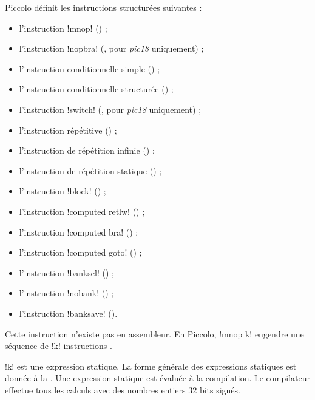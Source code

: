 Piccolo définit les instructions structurées suivantes :
\begin{itemize}
  \item l'instruction \pic!mnop! () ;
  \item l'instruction \pic!nopbra! (, pour \emph{pic18} uniquement) ;
  \item l'instruction conditionnelle simple () ;
  \item l'instruction conditionnelle structurée () ;
  \item l'instruction \pic!switch! (, pour \emph{pic18} uniquement) ;
  \item l'instruction répétitive () ;
  \item l'instruction de répétition infinie () ;
  \item l'instruction de répétition statique () ;
  \item l'instruction \pic!block! () ;
  \item l'instruction \pic!computed retlw! () ;
  \item l'instruction \pic!computed bra! () ;
  \item l'instruction \pic!computed goto! () ;
  \item l'instruction \pic!banksel! () ;
  \item l'instruction \pic!nobank! () ;
  \item l'instruction \pic!banksave! ().
\end{itemize}





Cette instruction n'existe pas en assembleur. En Piccolo, \pic!mnop k! engendre une séquence de \pic!k! instructions .

\pic!k! est une expression statique. La forme générale des expressions statiques est donnée à la . Une expression statique est évaluée à la compilation. Le compilateur effectue tous les calculs avec des nombres entiers 32 bits signés.





